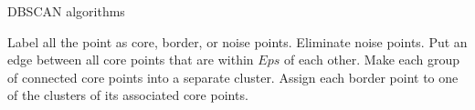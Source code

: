 \begin{algorithm}
	\caption{DBSCAN algorithms}\label{alg:dbscan}
	\begin{algorithmic}[1]
		\State Label all the point as core, border, or noise points.
		\State Eliminate noise points.
		\State Put an edge between all core points that are within $Eps$ of each other.
		\State Make each group of connected core points into a separate cluster.
		\State Assign each border point to one of the clusters of its associated core points.
	\end{algorithmic}
\end{algorithm}